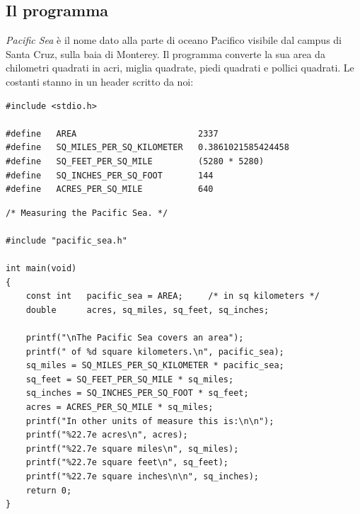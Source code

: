 \subsection{Il programma}

\textit{Pacific Sea} è il nome dato alla parte di oceano Pacifico visibile
dal campus di Santa Cruz, sulla baia di Monterey. Il programma converte la
sua area da chilometri quadrati in acri, miglia quadrate, piedi quadrati e
pollici quadrati. Le costanti stanno in un header scritto da noi:

\begin{lstlisting}[style=h, name=pacific_sea.h]
#include <stdio.h>

#define   AREA                        2337
#define   SQ_MILES_PER_SQ_KILOMETER   0.3861021585424458
#define   SQ_FEET_PER_SQ_MILE         (5280 * 5280)
#define   SQ_INCHES_PER_SQ_FOOT       144
#define   ACRES_PER_SQ_MILE           640
\end{lstlisting}

\begin{lstlisting}[style=c, name=pacific_sea.c]
/* Measuring the Pacific Sea. */

#include "pacific_sea.h"

int main(void)
{
    const int   pacific_sea = AREA;     /* in sq kilometers */
    double      acres, sq_miles, sq_feet, sq_inches;

    printf("\nThe Pacific Sea covers an area");
    printf(" of %d square kilometers.\n", pacific_sea);
    sq_miles = SQ_MILES_PER_SQ_KILOMETER * pacific_sea;
    sq_feet = SQ_FEET_PER_SQ_MILE * sq_miles;
    sq_inches = SQ_INCHES_PER_SQ_FOOT * sq_feet;
    acres = ACRES_PER_SQ_MILE * sq_miles;
    printf("In other units of measure this is:\n\n");
    printf("%22.7e acres\n", acres);
    printf("%22.7e square miles\n", sq_miles);
    printf("%22.7e square feet\n", sq_feet);
    printf("%22.7e square inches\n\n", sq_inches);
    return 0;
}
\end{lstlisting}


